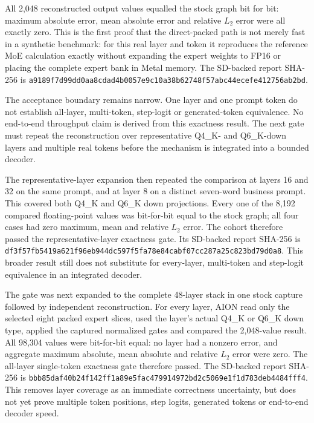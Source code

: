 All 2{,}048 reconstructed output values equalled the stock graph bit for bit:
maximum absolute error, mean absolute error and relative $L_2$ error were all
exactly zero.  This is the first proof that the direct-packed path is not merely
fast in a synthetic benchmark: for this real layer and token it reproduces the
reference MoE calculation exactly without expanding the expert weights to
FP16 or placing the complete expert bank in Metal memory.  The SD-backed report
SHA-256 is
\texttt{a9189f7d99dd0aa8cdad4b0057e9c10a38b62748f57abc44ecefe412756ab2bd}.

The acceptance boundary remains narrow.  One layer and one prompt token do not
establish all-layer, multi-token, step-logit or generated-token equivalence.
No end-to-end throughput claim is derived from this exactness result.  The next
gate must repeat the reconstruction over representative Q4\_K- and Q6\_K-down
layers and multiple real tokens before the mechanism is integrated into a
bounded decoder.

The representative-layer expansion then repeated the comparison at layers 16
and 32 on the same prompt, and at layer 8 on a distinct seven-word business
prompt.  This covered both Q4\_K and Q6\_K down projections.  Every one of the
8{,}192 compared floating-point values was bit-for-bit equal to the stock graph;
all four cases had zero maximum, mean and relative $L_2$ error.  The cohort
therefore passed the representative-layer exactness gate.  Its SD-backed report
SHA-256 is
\texttt{df3f57fb5419a621f96eb944dc597f5fa78e84cabf07cc287a25c823bd79d0a8}.
This broader result still does not substitute for every-layer, multi-token and
step-logit equivalence in an integrated decoder.

The gate was next expanded to the complete 48-layer stack in one stock capture
followed by independent reconstruction.  For every layer, AION read only the
selected eight packed expert slices, used the layer's actual Q4\_K or Q6\_K down
type, applied the captured normalized gates and compared the 2{,}048-value
result.  All 98{,}304 values were bit-for-bit equal: no layer had a nonzero
error, and aggregate maximum absolute, mean absolute and relative $L_2$ error
were zero.  The all-layer single-token exactness gate therefore passed.  The
SD-backed report SHA-256 is
\texttt{bbb85daf40b24f142ff1a89e5fac479914972bd2c5069e1f1d783deb4484fff4}.
This removes layer coverage as an immediate correctness uncertainty, but does
not yet prove multiple token positions, step logits, generated tokens or
end-to-end decoder speed.

